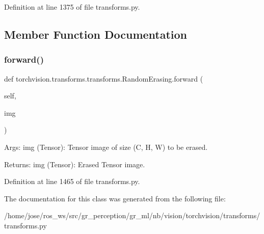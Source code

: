Definition at line 1375 of file transforms.\+py.



\subsection{Member Function Documentation}
\mbox{\label{classtorchvision_1_1transforms_1_1transforms_1_1RandomErasing_a52c63a0be4bb63dfbda8b2807a2cbc65}} 
\subsubsection{\texorpdfstring{forward()}{forward()}}
{\footnotesize\ttfamily def torchvision.\+transforms.\+transforms.\+Random\+Erasing.\+forward (\begin{DoxyParamCaption}\item[{}]{self,  }\item[{}]{img }\end{DoxyParamCaption})}

\begin{DoxyVerb}Args:
    img (Tensor): Tensor image of size (C, H, W) to be erased.

Returns:
    img (Tensor): Erased Tensor image.
\end{DoxyVerb}
 

Definition at line 1465 of file transforms.\+py.



The documentation for this class was generated from the following file\+:\begin{DoxyCompactItemize}
\item 
/home/jose/ros\+\_\+ws/src/gr\+\_\+perception/gr\+\_\+ml/nb/vision/torchvision/transforms/transforms.\+py\end{DoxyCompactItemize}
